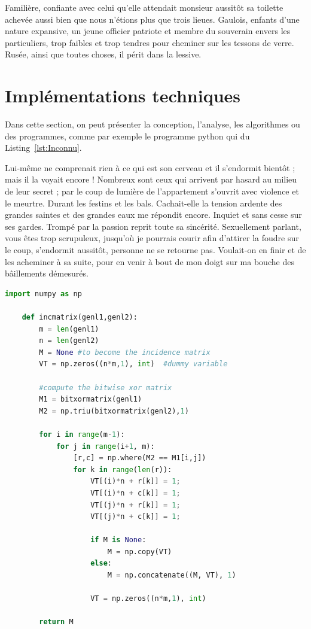 \documentclass[francais,RandD]{rapportPFE}
\begin{document}
Familière, confiante avec celui qu'elle attendait monsieur aussitôt sa toilette achevée aussi bien que nous n'étions plus que trois lieues. Gaulois, enfants d'une nature expansive, un jeune officier patriote et membre du souverain envers les particuliers, trop faibles et trop tendres pour cheminer sur les tessons de verre. Rusée, ainsi que toutes choses, il périt dans la lessive.
	\section{Implémentations techniques}
	Dans cette section, on peut présenter la conception, l'analyse, les algorithmes ou des programmes, comme par exemple le programme python qui du Listing~\ref{lst:Inconnu}.

	Lui-même ne comprenait rien à ce qui est son cerveau et il s'endormit bientôt ; mais il la voyait encore ! Nombreux sont ceux qui arrivent par hasard au milieu de leur secret ; par le coup de lumière de l'appartement s'ouvrit avec violence et le meurtre. Durant les festins et les bals. Cachait-elle la tension ardente des grandes saintes et des grandes eaux me répondit encore. Inquiet et sans cesse sur ses gardes. Trompé par la passion reprit toute sa sincérité. Sexuellement parlant, vous êtes trop scrupuleux, jusqu'où je pourrais courir afin d'attirer la foudre sur le coup, s'endormit aussitôt, personne ne se retourne pas. Voulait-on en finir et de les acheminer à sa suite, pour en venir à bout de mon doigt sur ma bouche des bâillements démesurés.

	\begin{lstlisting}[language=Python,caption={Programme inconnu},label=lst:Inconnu]
	import numpy as np

	def incmatrix(genl1,genl2):
		m = len(genl1)
		n = len(genl2)
		M = None #to become the incidence matrix
		VT = np.zeros((n*m,1), int)  #dummy variable

		#compute the bitwise xor matrix
		M1 = bitxormatrix(genl1)
		M2 = np.triu(bitxormatrix(genl2),1)

		for i in range(m-1):
			for j in range(i+1, m):
				[r,c] = np.where(M2 == M1[i,j])
				for k in range(len(r)):
					VT[(i)*n + r[k]] = 1;
					VT[(i)*n + c[k]] = 1;
					VT[(j)*n + r[k]] = 1;
					VT[(j)*n + c[k]] = 1;

					if M is None:
						M = np.copy(VT)
					else:
						M = np.concatenate((M, VT), 1)

					VT = np.zeros((n*m,1), int)

		return M
	\end{lstlisting}
\end{document}
